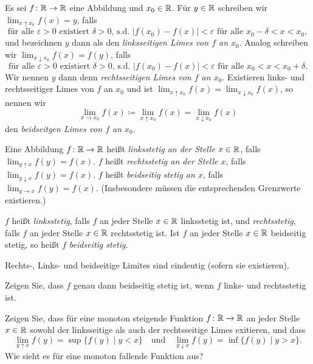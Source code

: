 \documentclass[a4paper,10pt]{article}
\begin{document}
\begin{defi}
 Es sei $f \colon \mathbb{R} \to \mathbb{R}$ eine Abbildung und $x_0 \in \mathbb{R}$. Für $y \in \mathbb{R}$ schreiben wir $\lim_{x \uparrow x_0} f(x) = y$, falls
 \[
  \text{für alle $\varepsilon > 0$ existiert $\delta > 0$, s.d.\ $|f(x_0)-f(x)| < \varepsilon$ für alle $x_0-\delta < x < x_0$},
 \]
 und bezeichnen $y$ dann als den \emph{linksseitigen Limes von $f$ an $x_0$}. Analog schreiben wir \mbox{$\lim_{x \downarrow x_0} f(x) = f(y)$}, falls
 \[
  \text{für alle $\varepsilon > 0$ existiert $\delta > 0$, s.d.\ $|f(x_0)-f(x)| < \varepsilon$ für alle $x_0 < x < x_0+\delta$}.
 \]
 Wir nennen $y$ dann denn \emph{rechtsseitigen Limes von $f$ an $x_0$}. Existieren links- und rechtsseitiger Limes von $f$ an $x_0$ und ist $\lim_{x \uparrow x_0} f(x) = \lim_{x \downarrow x_0} f(x)$, so nennen wir
 \[
  \lim_{x \to x_0} f(x) \coloneqq \lim_{x \uparrow x_0} f(x) = \lim_{x \downarrow x_0} f(x)
 \]
 den \emph{beidseitgen Limes von $f$ an $x_0$}.
\end{defi}


\begin{defi}
 Eine Abbildung $f \colon \mathbb{R} \to \mathbb{R}$ heißt \emph{linksstetig an der Stelle $x \in \mathbb{R}$}, falls $\lim_{y \uparrow x} f(y) = f(x)$. $f$ heißt \emph{rechtsstetig an der Stelle $x$}, falls $\lim_{y \downarrow x} f(y) = f(x)$. $f$ heißt \emph{beidseitig stetig an $x$}, falls $\lim_{y \to x} f(y) = f(x)$. (Insbesondere müssen die entsprechenden Grenzwerte existieren.)
 
 $f$ heißt \emph{linksstetig}, falls $f$ an jeder Stelle $x \in \mathbb{R}$ linksstetig ist, und \emph{rechtsstetig}, falls $f$ an jeder Stelle $x \in \mathbb{R}$ rechtsstetig ist. Ist $f$ an jeder Stelle $x \in \mathbb{R}$ beidseitig stetig, so heißt $f$ \emph{beidseitig stetig}.
\end{defi}


\begin{bem}
 Rechts-, Links- und beidseitige Limites sind eindeutig (sofern sie existieren).
\end{bem}


\begin{question}
 Zeigen Sie, dass $f$ genau dann beidseitig stetig ist, wenn $f$ links- und rechtsstetig ist.
\end{question}


\begin{question}
 Zeigen Sie, dass für eine monoton steigende Funktion $f \colon \mathbb{R} \to \mathbb{R}$ an jeder Stelle $x \in \mathbb{R}$ sowohl der linksseitige als auch der rechtsseitige Limes exitieren, und dass
 \[
  \lim_{y \uparrow x} f(y) = \sup\{f(y) \mid y < x\}
  \quad
  \text{und}
  \quad
  \lim_{y \downarrow x} f(y) = \inf\{f(y) \mid y > x\}.
 \]
 Wie sieht es für eine monoton fallende Funktion aus?
\end{question}
\end{document}
